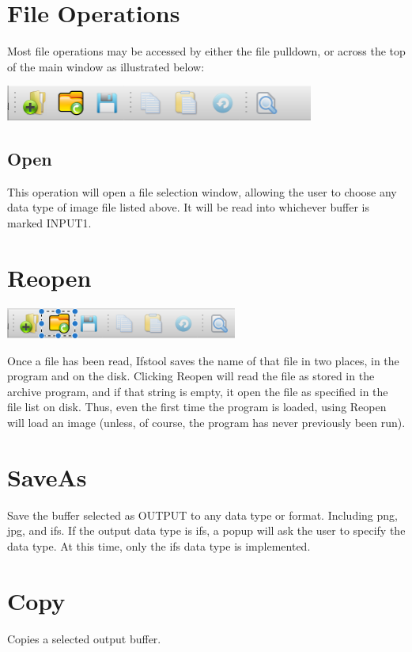 \documentclass[11pt]{amsart}
\begin{document}
\section{File Operations}
Most file operations may be accessed by either the file pulldown, or across the top of the main window as illustrated below:

\includegraphics[width=4in]{filepulldown.png}
\subsection{Open}
This operation will open a file selection window, allowing the user to choose any data type of image file listed above. It will be read into whichever buffer is marked INPUT1.
\section{Reopen}
\includegraphics[width=3in]{ReOpen.png}

Once a file has been read, Ifstool saves the name of that file in two places, in the program and on the disk.  Clicking Reopen will read the file as stored in the archive program, and if that string is empty, it open the file as specified in the file list on disk. Thus, even the first time the program is loaded, using Reopen will load an image (unless, of course, the program has never previously been run). 

\section{SaveAs}
Save the buffer selected as OUTPUT to any data type or format. Including png, jpg, and ifs. If the output data type is ifs, a popup will ask the user to specify the data type.  At this time, only the ifs data type is implemented.
\section{Copy}
Copies a selected output buffer.
\end{document}
